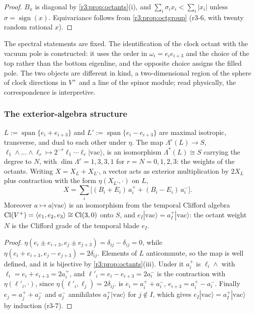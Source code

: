 \begin{proof}
$B_x$ is diagonal by \cref{r3:prop:octants}(i), and $\sum_i\sigma_ix_i<\sum_i|x_i|$ unless $\sigma=\operatorname{sign}(x)$. Equivariance follows
from \cref{r3:prop:octgroup} (r3-6, with twenty random rational $x$).
\end{proof}

The spectral statements are fixed. The identification of the clock octant with the vacuum pole is constructed: it uses the order in
$\omega_i=e_ie_{i+3}$ and the choice of the top rather than the bottom eigenline, and the opposite choice assigns the filled pole. The two
objects are different in kind, a two-dimensional region of the sphere of clock directions in $V^+$ and a line of the spinor module; read
physically, the correspondence is interpretive.

\subsubsection{The exterior-algebra structure}
\label{r3:sec:exterior}

\begin{proposition}
\label{r3:prop:fock}
$L:=\operatorname{span}\{e_i+e_{i+3}\}$ and $L':=\operatorname{span}\{e_i-e_{i+3}\}$ are maximal isotropic, transverse, and dual to each other
under $\eta$. The map $\Lambda^r(L)\to S$, $\ell_1\wedge\dots\wedge\ell_r\mapsto2^{-r}\ell_1\cdots\ell_r|\mathrm{vac}\rangle$, is an isomorphism
$\Lambda^*(L)\cong S$ carrying the degree to $N$, with $\dim\Lambda^r=1,3,3,1$ for $r=N=0,1,2,3$: the weights of the octants. Writing
$X=X_L+X_{L'}$, a vector acts as exterior multiplication by $2X_L$ plus contraction with the form $\eta(X_{L'},\cdot)$ on $L$,
\begin{equation}
\label{r3:eq:Xfock}
X=\sum_i\bigl[(B_i+E_i)\,a^+_i+(B_i-E_i)\,a^-_i\bigr].
\end{equation}
Moreover $a\mapsto a|\mathrm{vac}\rangle$ is an isomorphism from the temporal Clifford algebra $\mathrm{Cl}(V^+)=\langle e_1,e_2,e_3\rangle\cong\mathrm{Cl}(3,0)$ onto
$S$, and $e_I|\mathrm{vac}\rangle=a^+_I|\mathrm{vac}\rangle$: the octant weight $N$ is the Clifford grade of the temporal blade $e_I$.
\end{proposition}

\begin{proof}
$\eta(e_i\pm e_{i+3},e_j\pm e_{j+3})=\delta_{ij}-\delta_{ij}=0$, while $\eta(e_i+e_{i+3},e_j-e_{j+3})=2\delta_{ij}$. Elements of $L$ anticommute, so the
map is well defined, and it is bijective by \cref{r3:prop:octants}(iii). Under it $a^+_i$ is $\ell_i\wedge$ with $\ell_i=e_i+e_{i+3}=2a^+_i$, and
$\ell'_i=e_i-e_{i+3}=2a^-_i$ is the contraction with $\eta(\ell'_i,\cdot)$, since $\eta(\ell'_i,\ell_j)=2\delta_{ij}$.  is
$e_i=a^+_i+a^-_i$, $e_{i+3}=a^+_i-a^-_i$. Finally
$e_j=a^+_j+a^-_j$ and $a^-_j$ annihilates $a^+_I|\mathrm{vac}\rangle$ for $j\notin I$, which gives $e_I|\mathrm{vac}\rangle=a^+_I|\mathrm{vac}\rangle$ by induction (r3-7).
\end{proof}


